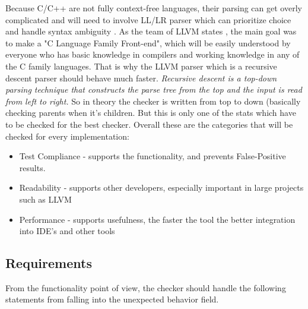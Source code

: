 Because C/C++ are not fully context-free languages, their parsing can get overly complicated and will need to involve LL/LR parser which can prioritize choice and handle syntax ambiguity \cite{parsing-problems}. As the team of LLVM states \cite{clang-parsing}, the main goal was to make a "C Language Family Front-end", which will be easily understood by everyone who has basic knowledge in compilers and working knowledge in any of the C family languages. That is why the LLVM parser which is a recursive descent parser should behave much faster. \textit{Recursive descent is a top-down parsing technique that constructs the parse tree from the top and the input is read from left to right.} So in theory the checker is written from top to down (basically checking parents when it's children. But this is only one of the stats which have to be checked for the best checker. Overall these are the categories that will be checked for every implementation:

\begin{itemize}
    \item Test Compliance - supports the functionality, and prevents False-Positive results.
    \item Readability - supports other developers, especially important in large projects such as LLVM
    \item Performance - supports usefulness, the faster the tool the better integration into IDE's and other tools
\end{itemize}

\subsection{Requirements}
From the functionality point of view, the checker should handle the following statements from falling into the unexpected behavior field.

